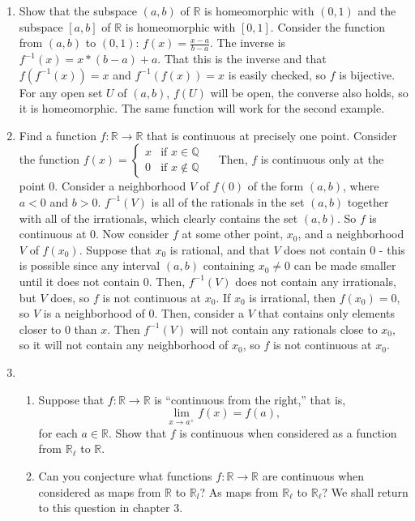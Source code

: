 \documentclass[12pt,letterpaper]{article}
\newcommand{\n}{\break}
\begin{document}
\begin{enumerate}
  \item Show that the subspace $(a,b)$ of $\mathbb{R}$ is homeomorphic with $(0,1)$ and the subspace $[a,b]$ of $\mathbb{R}$ is homeomorphic with $[0,1]$.\n
  \indent Consider the function from $(a,b)$ to $(0,1)$: $f(x)=\frac{x-a}{b-a}$. The inverse is $f^{-1}(x)=x*(b-a)+a$. That this is the inverse and that $f(f^{-1}(x)) = x$ and $f^{-1}(f(x))=x$ is easily checked, so $f$ is bijective. For any open set $U$ of $(a,b)$, $f(U)$ will be open, the converse also holds, so it is homeomorphic. The same function will work for the second example.
  \item Find a function $f: \mathbb{R}\rightarrow \mathbb{R}$ that is continuous at precisely one point.\hspace{5in}\n
  \indent Consider the function $f(x) = \begin{cases} x & \text{if } x\in\mathbb{Q} \\ 0 & \text{if } x\not\in\mathbb{Q}\end{cases}\quad$ Then, $f$ is continuous only at the point 0. \hspace{3in}\n
  Consider a neighborhood $V$ of $f(0)$ of the form $(a,b)$, where $a<0$ and $b>0$. $f^{-1}(V)$ is all of the rationals in the set $(a,b)$ together with all of the irrationals, which clearly contains the set $(a,b)$. So $f$ is continuous at 0. Now consider $f$ at some other point, $x_0$, and a neighborhood $V$ of $f(x_0)$. Suppose that $x_0$ is rational, and that $V$ does not contain 0 - this is possible since any interval $(a,b)$ containing $x_0\neq 0$ can be made smaller until it does not contain 0. Then, $f^{-1}(V)$ does not contain any irrationals, but $V$ does, so $f$ is not continuous at $x_0$. If $x_0$ is irrational, then $f(x_0)=0$, so $V$ is a neighborhood of $0$. Then, consider a $V$ that contains only elements closer to 0 than $x$. Then $f^{-1}(V)$ will not contain any rationals close to $x_0$, so it will not contain any neighborhood of $x_0$, so $f$ is not continuous at $x_0$.
  \item
  \begin{enumerate}
    \item Suppose that $f: \mathbb{R} \rightarrow \mathbb{R}$ is ``continuous from the right,'' that is, $$\lim_{x\rightarrow a^+} f(x)=f(a),$$ for each $a\in\mathbb{R}$. Show that $f$ is continuous when considered as a function from $\mathbb{R}_\ell$ to $\mathbb{R}$.\hspace{5in}\n
    \item Can you conjecture what functions $f:\mathbb{R}\rightarrow \mathbb{R}$ are continuous when considered as maps from $\mathbb{R}$ to $\mathbb{R}_l$? As maps from $\mathbb{R}_\ell$ to $\mathbb{R}_\ell?$ We shall return to this question in chapter 3.

\end{enumerate}
\end{enumerate}
\end{document}
